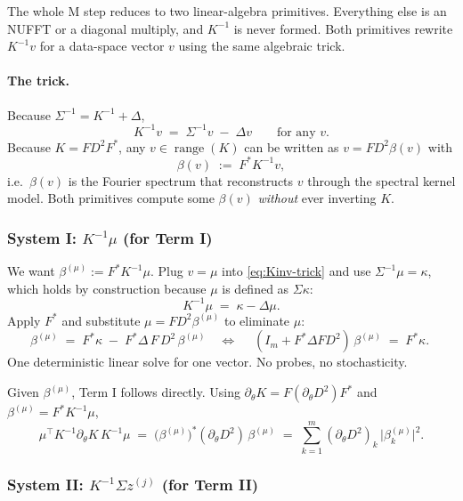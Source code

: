 \documentclass{article}
\begin{document}
The whole M step reduces to two linear-algebra primitives. Everything else is an NUFFT or a diagonal multiply, and $K^{-1}$ is never formed. Both primitives rewrite $K^{-1}v$ for a data-space vector $v$ using the same algebraic trick.

\paragraph{The trick.}
Because $\Sigma^{-1}=K^{-1}+\Delta$,
\begin{equation}
  K^{-1}v \;=\; \Sigma^{-1}v \;-\; \Delta v \qquad\text{for any }v.
  \label{eq:Kinv-trick}
\end{equation}
Because $K=FD^{2}F^{*}$, any $v\in\operatorname{range}(K)$ can be written as $v = FD^{2}\beta(v)$ with
\[
  \beta(v) \;:=\; F^{*}K^{-1}v,
\]
i.e.\ $\beta(v)$ is the Fourier spectrum that reconstructs $v$ through the spectral kernel model. Both primitives compute some $\beta(v)$ \emph{without} ever inverting $K$.

\subsubsection{System I: $K^{-1}\mu$ (for Term I)}

We want $\beta^{(\mu)}:=F^{*}K^{-1}\mu$. Plug $v=\mu$ into \eqref{eq:Kinv-trick} and use $\Sigma^{-1}\mu=\kappa$, which holds by construction because $\mu$ is defined as $\Sigma\kappa$:
\[
  K^{-1}\mu \;=\; \kappa - \Delta\mu.
\]
Apply $F^{*}$ and substitute $\mu=FD^{2}\beta^{(\mu)}$ to eliminate $\mu$:
\begin{equation}
  \beta^{(\mu)} \;=\; F^{*}\kappa \;-\; F^{*}\Delta\,F\,D^{2}\,\beta^{(\mu)}
  \quad\Longleftrightarrow\quad
  \boxed{\;(I_m + F^{*}\Delta F D^{2})\,\beta^{(\mu)} \;=\; F^{*}\kappa.\;}
  \label{eq:sysI}
\end{equation}
One deterministic linear solve for one vector. No probes, no stochasticity.

Given $\beta^{(\mu)}$, Term I follows directly. Using $\partial_\theta K = F(\partial_\theta D^{2})F^{*}$ and $\beta^{(\mu)}=F^{*}K^{-1}\mu$,
\begin{equation}
  \mu^{\top}K^{-1}\partial_\theta K\,K^{-1}\mu
  \;=\;
  \bigl(\beta^{(\mu)}\bigr)^{*}(\partial_\theta D^{2})\,\beta^{(\mu)}
  \;=\;
  \sum_{k=1}^{m}(\partial_\theta D^{2})_{k}\,\bigl|\beta^{(\mu)}_{k}\bigr|^{2}.
  \label{eq:termI}
\end{equation}

\subsubsection{System II: $K^{-1}\Sigma z^{(j)}$ (for Term II)}
\end{document}
